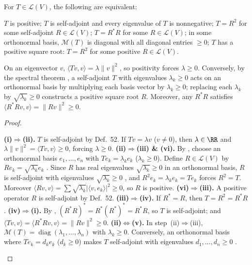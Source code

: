 \documentclass[10pt]{scrartcl}
\newcommand{\LL}{\mathcal L}\newcommand{\PP}{\mathcal P}\newcommand{\MM}{\mathcal M}
\begin{document}
\begin{theorem*}
  For $T\in\LL(V)$, the following are equivalent:
  \begin{enumerate}
    \ii[(i)] $T$ is positive;
    \ii[(ii)] $T$ is self-adjoint and every eigenvalue of $T$ is nonnegative;
    \ii[(iii)] $T=R^2$ for some self-adjoint $R\in\LL(V)$;
    \ii[(iv)] $T=R^*R$ for some $R\in\LL(V)$;
    \ii[(v)] in some orthonormal basis, $\MM(T)$ is diagonal with all diagonal entries $\ge0$;
    \ii[(vi)] $T$ has a positive square root: $T=R^2$ for some positive $R\in\LL(V)$.
  \end{enumerate}
\end{theorem*}
\begin{ideabox}
  On an eigenvector $v$, $\langle Tv,v\rangle = \lambda\|v\|^2$, so positivity forces $\lambda\ge0$. Conversely, by the spectral theorem , a self-adjoint $T$ with eigenvalues $\lambda_k\ge0$ acts on an orthonormal basis by multiplying each basis vector by $\lambda_k\ge0$; replacing each $\lambda_k$ by $\sqrt{\lambda_k}\ge0$ constructs a positive square root $R$. Moreover, any $R^*R$ satisfies $\langle R^*Rv,v\rangle = \|Rv\|^2 \ge 0$.
\end{ideabox}
\begin{proof}
  \begin{steps}
    \ii \textbf{(i)$\Rightarrow$(ii).} $T$ is self-adjoint by Def.~52. If $Tv=\lambda v$ ($v\neq0$), then $\lambda\in\RR$  and $\lambda\|v\|^2=\langle Tv,v\rangle\ge0$, forcing $\lambda\ge0$.
    \ii \textbf{(ii)$\Rightarrow$(iii) \& (vi).} By , choose an orthonormal basis $e_1,\dots,e_n$ with $Te_k=\lambda_k e_k$ ($\lambda_k\ge0$). Define $R\in\LL(V)$ by $Re_k=\sqrt{\lambda_k}e_k$ . Since $R$ has real eigenvalues $\sqrt{\lambda_k}\ge0$ in an orthonormal basis, $R$ is self-adjoint  with eigenvalues $\sqrt{\lambda_k}\ge0$ , and $R^2e_k=\lambda_k e_k=Te_k$ forces $R^2=T$. Moreover $\langle Rv,v\rangle = \sum \sqrt{\lambda_k}|\langle v,e_k\rangle|^2 \ge 0$, so $R$ is positive.
    \ii \textbf{(vi)$\Rightarrow$(iii).} A positive operator $R$ is self-adjoint by Def.~52.
    \ii \textbf{(iii)$\Rightarrow$(iv).} If $R^*=R$, then $T=R^2=R^*R$.
    \ii \textbf{(iv)$\Rightarrow$(i).} By , $(R^*R)^*=R^*(R^*)^*=R^*R$, so $T$ is self-adjoint; and $\langle Tv,v\rangle=\langle R^*Rv,v\rangle=\|Rv\|^2\ge0$.
    \ii \textbf{(ii)$\Leftrightarrow$(v).} In step~(ii)$\Rightarrow$(iii), $\MM(T)=\operatorname{diag}(\lambda_1,\dots,\lambda_n)$ with $\lambda_k\ge0$. Conversely, an orthonormal basis where $Te_k=d_ke_k$ ($d_k\ge0$) makes $T$ self-adjoint  with eigenvalues $d_1,\dots,d_n\ge0$ .
  \end{steps}
\end{proof}
\end{document}
